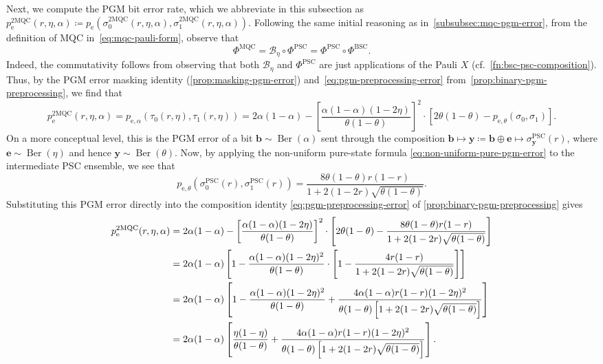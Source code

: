 \documentclass[11pt]{article}
\theoremstyle{remark}
\newcommand{\Ber}{\operatorname{Ber}}
\newcommand{\bb}{\mathbf{b}}
\newcommand{\be}{\mathbf{e}}
\newcommand{\by}{\mathbf{y}}
\newcommand{\BSC}{\mathrm{BSC}}
\newcommand{\PSC}{\mathrm{PSC}}
\newcommand{\MQC}{\mathrm{MQC}}
\newcommand{\mMQC}{2\mathrm{MQC}}
\begin{document}
Next, we compute the PGM bit error rate, which we abbreviate in this subsection as $p_{\mathrm{e}}^{\mMQC}(r,\eta,\alpha) \coloneqq p_{\mathrm{e}}(\sigma_0^{\mMQC}(r,\eta,\alpha),\sigma_1^{\mMQC}(r,\eta,\alpha))$. Following the same initial reasoning as in~\cref{subsubsec:mqc-pgm-error}, from the definition of MQC in~\eqref{eq:mqc-pauli-form}, observe that
\begin{equation*}
\Phi^{\MQC} = \mathcal{B}_\eta \circ \Phi^{\PSC} = \Phi^{\PSC} \circ \Phi^{\BSC}.
\end{equation*}
Indeed, the commutativity follows from observing that both $\mathcal{B}_\eta$ and $\Phi^{\PSC}$ are just applications of the Pauli $X$ (cf.~\cref{fn:bsc-psc-composition}). Thus, by the PGM error masking identity (\cref{prop:masking-pgm-error}) and~\cref{eq:pgm-preprocessing-error} from~\cref{prop:binary-pgm-preprocessing}, we find that
\begin{equation*}
p_{\mathrm{e}}^{\mMQC}(r,\eta,\alpha) = p_{\mathrm{e},\alpha}(\tau_0(r,\eta),\tau_1(r,\eta)) 
= 2\alpha(1-\alpha) - \left[
\frac{\alpha(1-\alpha)(1-2\eta)}
{\theta(1-\theta)}
\right]^2 \cdot \left[
2\theta(1-\theta)-p_{\mathrm{e},\theta}(\sigma_0,\sigma_1)
\right].
\end{equation*}
On a more conceptual level, this is the PGM error of a bit $\bb \sim \Ber(\alpha)$ sent through the composition $\bb \mapsto \by \coloneqq \bb \oplus \be \mapsto \sigma_{\by}^{\PSC}(r)$, where $\be \sim \Ber(\eta)$ and hence $\by \sim \Ber(\theta)$. Now, by applying the non-uniform pure-state formula \eqref{eq:non-uniform-pure-pgm-error} to the intermediate PSC ensemble, we see that
\begin{equation*}
p_{\mathrm{e},\theta}\left(\sigma_0^{\PSC}(r),\sigma_1^{\PSC}(r)\right)
= \frac{8\theta(1-\theta)r(1-r)}{1+2(1-2r)\sqrt{\theta(1-\theta)}}.
\end{equation*}
Substituting this PGM error directly into the composition identity \eqref{eq:pgm-preprocessing-error} of \cref{prop:binary-pgm-preprocessing} gives
\begin{align}
\label{eq:2mqc-pgm-error-formula}
p_{\mathrm{e}}^{\mMQC}(r,\eta,\alpha)
&= 2\alpha(1-\alpha) - \left[
\frac{\alpha(1-\alpha)(1-2\eta)}
{\theta(1-\theta)}
\right]^2 \cdot \left[
2\theta(1-\theta)-\frac{8\theta(1-\theta)r(1-r)}{1+2(1-2r)\sqrt{\theta(1-\theta)}}
\right] \notag \\
&= 2\alpha(1-\alpha)\left[1 -
\frac{\alpha(1-\alpha)(1-2\eta)^2}
{\theta(1-\theta)} \cdot \left[
1-\frac{4r(1-r)}{1+2(1-2r)\sqrt{\theta(1-\theta)}}
\right]\right] \notag \\
&= 2\alpha(1-\alpha)\left[1 -
\frac{\alpha(1-\alpha)(1-2\eta)^2}
{\theta(1-\theta)}
+\frac{4\alpha(1-\alpha)r(1-r)(1-2\eta)^2}{\theta(1-\theta)\left[1+2(1-2r)\sqrt{\theta(1-\theta)}\right]}
\right] \notag \\
&= 2\alpha(1-\alpha)
\left[
\frac{\eta(1-\eta)}{\theta(1-\theta)}
+\frac{4\alpha(1-\alpha)r(1-r)(1-2\eta)^2}
{\theta(1-\theta)
\left[1+2(1-2r)\sqrt{\theta(1-\theta)}\right]}
\right].
\end{align}
\end{document}
